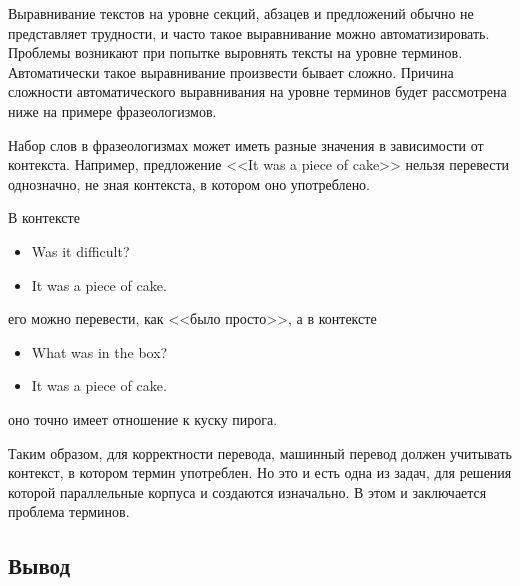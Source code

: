 Выравнивание текстов на уровне секций, абзацев и предложений обычно не представляет трудности, и часто такое выравнивание можно автоматизировать.
Проблемы возникают при попытке выровнять тексты на уровне терминов.
Автоматически такое выравнивание произвести бывает сложно.
Причина сложности автоматического выравнивания на уровне терминов будет рассмотрена ниже на примере фразеологизмов.

Набор слов в фразеологизмах может иметь разные значения в зависимости от контекста.
Например, предложение <<It was a piece of cake>> нельзя перевести однозначно, не зная контекста, в котором оно употреблено.

В контексте 
\begin{itemize}
    \item Was it difficult?
    \item It was a piece of cake.
\end{itemize}
его можно перевести, как <<было просто>>, а в контексте
\begin{itemize}
    \item What was in the box?
    \item It was a piece of cake.
\end{itemize}
оно точно имеет отношение к куску пирога.

Таким образом, для корректности перевода, машинный перевод должен учитывать контекст, в котором термин употреблен.
Но это и есть одна из задач, для решения которой параллельные корпуса и создаются изначально.
В этом и заключается проблема терминов.



\subsection{Вывод}
